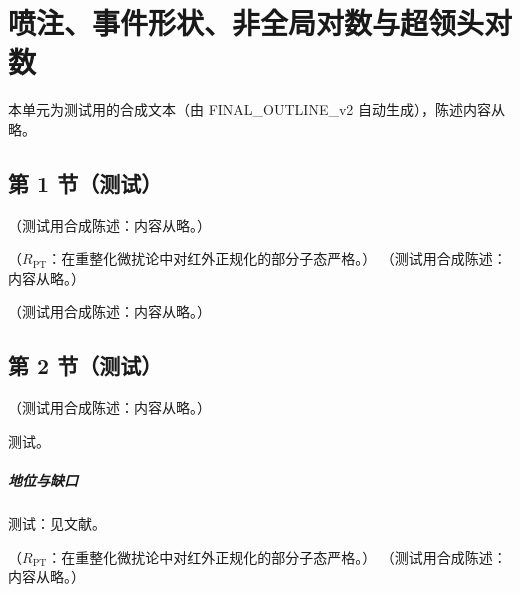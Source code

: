 \chapter{喷注、事件形状、非全局对数与超领头对数}\label{ch:jets}
本单元为测试用的合成文本（由 FINAL\_OUTLINE\_v2 自动生成），陈述内容从略。

\section{第 1 节（测试）}\label{sec:jets-irsafe}

\begin{definition}[红外安全的喷注定义与事件形状]\label{def:jets-algorithms}
（测试用合成陈述：内容从略。）
\end{definition}

\begin{proposition}\label{prop:jets-sw}
（$R_{\mathrm{PT}}$：在重整化微扰论中对红外正规化的部分子态严格。）
（测试用合成陈述：内容从略。）
\end{proposition}

\begin{example}\label{ex:jets-sw}
（测试用合成陈述：内容从略。）
\end{example}

\section{第 2 节（测试）}\label{sec:jets-hadronization}

\begin{corollary}\label{cor:jets-ir-finite}
（测试用合成陈述：内容从略。）
\end{corollary}
\begin{proofsketch}测试。\end{proofsketch}
\paragraph{地位与缺口}测试：见文献。

\begin{proposition}\label{prop:jets-thrust-lo}
（$R_{\mathrm{PT}}$：在重整化微扰论中对红外正规化的部分子态严格。）
（测试用合成陈述：内容从略。）
\end{proposition}

